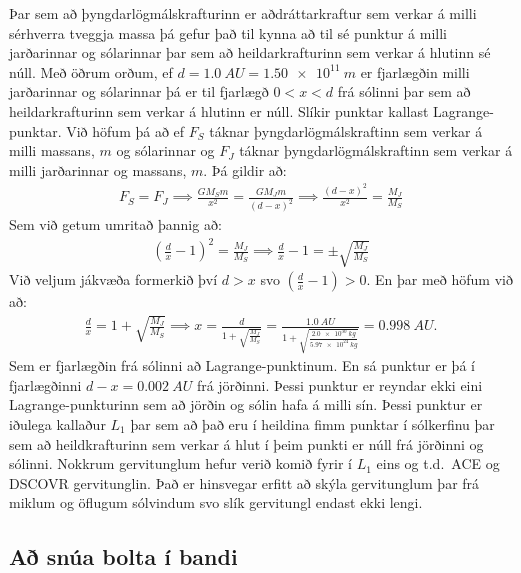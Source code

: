 \ifdefined \wholebook \else\documentclass[oneside]{book}\usepackage{EdlBook}\graphicspath{{figures/}}
\begin{document}
Þar sem að þyngdarlögmálskrafturinn er aðdráttarkraftur sem verkar á milli sérhverra tveggja massa þá gefur það til kynna að til sé punktur á milli jarðarinnar og sólarinnar þar sem að heildarkrafturinn sem verkar á hlutinn sé núll. Með öðrum orðum, ef $d = \SI{1.0}{AU} = \SI{1.50e11}{m}$ er fjarlægðin milli jarðarinnar og sólarinnar þá er til fjarlægð $0 < x < d$ frá sólinni þar sem að heildarkrafturinn sem verkar á hlutinn er núll. Slíkir punktar kallast Lagrange-punktar. Við höfum þá að ef $F_S$ táknar þyngdarlögmálskraftinn sem verkar á milli massans, $m$ og sólarinnar og $F_J$ táknar þyngdarlögmálskraftinn sem verkar á milli jarðarinnar og massans, $m$. Þá gildir að:
\begin{align*}
    F_S = F_J \implies \frac{GM_Sm}{x^2} = \frac{GM_Jm}{(d-x)^2} \implies \frac{(d-x)^2}{x^2} = \frac{M_J}{M_S}
\end{align*}
Sem við getum umritað þannig að:
\begin{align*}
    \left( \frac{d}{x}-1 \right)^2 = \frac{M_J}{M_S} \implies \frac{d}{x}-1 =  \pm \sqrt{\frac{M_J}{M_S}}
\end{align*}
Við veljum jákvæða formerkið því $d > x$ svo $\left(\frac{d}{x}-1\right) > 0$. En þar með höfum við að:
\begin{align*}
    \frac{d}{x} = 1 + \sqrt{\frac{M_J}{M_S}} \implies x = \frac{d}{1+\sqrt{\frac{M_J}{M_S}}} = \frac{\SI{1.0}{AU}}{1+ \sqrt{\frac{\SI{2.0e30}{kg}}{\SI{5.97e24}{kg}}}} = \SI{0.998}{AU}.
\end{align*}
Sem er fjarlægðin frá sólinni að Lagrange-punktinum. En sá punktur er þá í fjarlægðinni $d-x = \SI{0.002}{AU}$ frá jörðinni. Þessi punktur er reyndar ekki eini Lagrange-punkturinn sem að jörðin og sólin hafa á milli sín. Þessi punktur er iðulega kallaður $L_1$ þar sem að það eru í heildina fimm punktar í sólkerfinu þar sem að heildkrafturinn sem verkar á hlut í þeim punkti er núll frá jörðinni og sólinni. Nokkrum gervitunglum hefur verið komið fyrir í $L_1$ eins og t.d.~ACE og DSCOVR gervitunglin. Það er hinsvegar erfitt að skýla gervitunglum þar frá miklum og öflugum sólvindum svo slík gervitungl endast ekki lengi.

\subsection*{Að snúa bolta í bandi}
\end{document}
